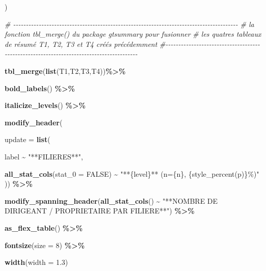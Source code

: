 \documentclass[
]{article}
\newenvironment{Shaded}{\begin{snugshade}}{\end{snugshade}}
\newcommand{\AttributeTok}[1]{\textcolor[rgb]{0.13,0.29,0.53}{#1}}
\newcommand{\CommentTok}[1]{\textcolor[rgb]{0.56,0.35,0.01}{\textit{#1}}}
\newcommand{\ConstantTok}[1]{\textcolor[rgb]{0.56,0.35,0.01}{#1}}
\newcommand{\DecValTok}[1]{\textcolor[rgb]{0.00,0.00,0.81}{#1}}
\newcommand{\FloatTok}[1]{\textcolor[rgb]{0.00,0.00,0.81}{#1}}
\newcommand{\FunctionTok}[1]{\textcolor[rgb]{0.13,0.29,0.53}{\textbf{#1}}}
\newcommand{\NormalTok}[1]{#1}
\newcommand{\SpecialCharTok}[1]{\textcolor[rgb]{0.81,0.36,0.00}{\textbf{#1}}}
\newcommand{\StringTok}[1]{\textcolor[rgb]{0.31,0.60,0.02}{#1}}
\begin{document}
\begin{Shaded}
\begin{Highlighting}[]
\NormalTok{)}





\CommentTok{\# {-}{-}{-}{-}{-}{-}{-}{-}{-}{-}{-}{-}{-}{-}{-}{-}{-}{-}{-}{-}{-}{-}{-}{-}{-}{-}{-}{-}{-}{-}{-}{-}{-}{-}{-}{-}{-}{-}{-}{-}{-}{-}{-}{-}{-}{-}{-}{-}{-}{-}{-}{-}{-}{-}{-}{-}{-}{-}{-}{-}{-}{-}{-}{-}{-}{-}{-}{-}{-}{-}{-}{-}{-}{-}{-}{-}{-}{-}{-}{-}{-}{-}{-}{-}{-}{-}{-}{-}}
\CommentTok{\# la fonction tbl\_merge() du package gtsummary pour fusionner}
\CommentTok{\#  les quatres tableaux de résumé T1, T2, T3 et T4 créés précédemment}
\CommentTok{\#{-}{-}{-}{-}{-}{-}{-}{-}{-}{-}{-}{-}{-}{-}{-}{-}{-}{-}{-}{-}{-}{-}{-}{-}{-}{-}{-}{-}{-}{-}{-}{-}{-}{-}{-}{-}{-}{-}{-}{-}{-}{-}{-}{-}{-}{-}{-}{-}{-}{-}{-}{-}{-}{-}{-}{-}{-}{-}{-}{-}{-}{-}{-}{-}{-}{-}{-}{-}{-}{-}{-}{-}{-}{-}{-}{-}{-}{-}{-}{-}{-}{-}{-}{-}{-}{-}{-}{-}{-}}





\FunctionTok{tbl\_merge}\NormalTok{(}\FunctionTok{list}\NormalTok{(T1,T2,T3,T4))}\SpecialCharTok{\%\textgreater{}\%} 
  
  \FunctionTok{bold\_labels}\NormalTok{() }\SpecialCharTok{\%\textgreater{}\%}
  
  \FunctionTok{italicize\_levels}\NormalTok{() }\SpecialCharTok{\%\textgreater{}\%}
  
  \FunctionTok{modify\_header}\NormalTok{(}
    
  \AttributeTok{update =} \FunctionTok{list}\NormalTok{( }
    
\NormalTok{    label }\SpecialCharTok{\textasciitilde{}} \StringTok{"**FILIERES**"}\NormalTok{, }
    
    \FunctionTok{all\_stat\_cols}\NormalTok{(}\AttributeTok{stat\_0 =} \ConstantTok{FALSE}\NormalTok{) }\SpecialCharTok{\textasciitilde{}} \StringTok{"**\{level\}** (n=\{n\},}
\StringTok{    }
\StringTok{    \{style\_percent(p)\}\%)"}
\NormalTok{)) }\SpecialCharTok{\%\textgreater{}\%}
  
  \FunctionTok{modify\_spanning\_header}\NormalTok{(}\FunctionTok{all\_stat\_cols}\NormalTok{() }\SpecialCharTok{\textasciitilde{}} \StringTok{"**NOMBRE DE DIRIGEANT / PROPRIETAIRE PAR FILIERE**"}\NormalTok{) }\SpecialCharTok{\%\textgreater{}\%}
  
  \FunctionTok{as\_flex\_table}\NormalTok{() }\SpecialCharTok{\%\textgreater{}\%}
  
  \FunctionTok{fontsize}\NormalTok{(}\AttributeTok{size =} \DecValTok{8}\NormalTok{) }\SpecialCharTok{\%\textgreater{}\%}
  
  \FunctionTok{width}\NormalTok{(}\AttributeTok{width =} \FloatTok{1.3}\NormalTok{)}
\end{Highlighting}
\end{Shaded}
\end{document}
